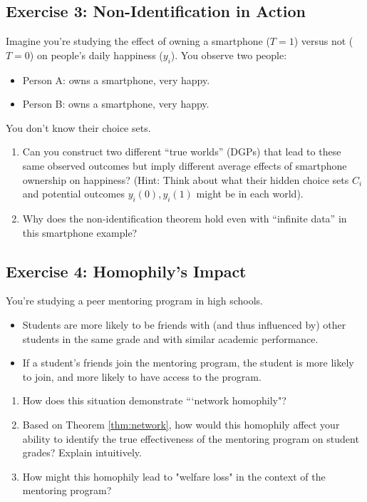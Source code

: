 \documentclass{article}
\begin{document}
\subsection*{Exercise 3: Non-Identification in Action}
Imagine you're studying the effect of owning a smartphone ($T=1$) versus not ($T=0$) on people's daily happiness ($y_i$). You observe two people:
\begin{itemize}
    \item Person A: owns a smartphone, very happy.
    \item Person B: owns a smartphone, very happy.
\end{itemize}
You don't know their choice sets.
\begin{enumerate}
    \item  Can you construct two different ``true worlds'' (DGPs) that lead to these same observed outcomes but imply different average effects of smartphone ownership on happiness? (Hint: Think about what their hidden choice sets $C_i$ and potential outcomes $y_i(0), y_i(1)$ might be in each world).
    \item  Why does the non-identification theorem hold even with ``infinite data'' in this smartphone example?
\end{enumerate}

\subsection*{Exercise 4: Homophily's Impact}
You're studying a peer mentoring program in high schools.
\begin{itemize}
    \item Students are more likely to be friends with (and thus influenced by) other students in the same grade and with similar academic performance.
    \item If a student's friends join the mentoring program, the student is more likely to join, and more likely to have access to the program.
\end{itemize}
\begin{enumerate}
    \item  How does this situation demonstrate ```network homophily"?
    \item  Based on Theorem \ref{thm:network}, how would this homophily affect your ability to identify the true effectiveness of the mentoring program on student grades? Explain intuitively.
    \item  How might this homophily lead to "welfare loss" in the context of the mentoring program?
\end{enumerate}
\end{document}
